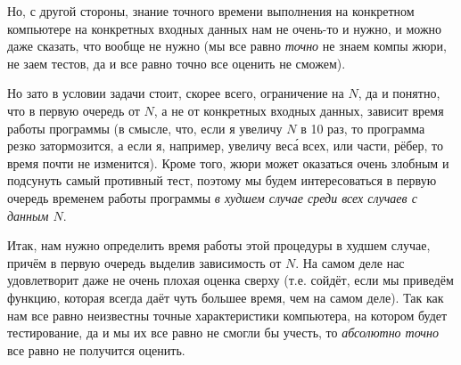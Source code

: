 {Но, с другой стороны, знание точного времени выполнения на конкретном 
компьютере на конкретных входных данных нам не очень-то и нужно, и можно даже 
сказать, что вообще не нужно (мы все равно \textit{точно} не знаем компы жюри, 
не заем тестов, да и все равно точно все оценить не сможем).

Но зато в условии задачи стоит, скорее всего, ограничение на $N$, да и 
понятно, что в первую очередь от $N$, а не от конкретных входных данных,
зависит время работы программы (в смысле, что, если я увеличу $N$ в 10 раз, то 
программа резко затормозится, а если я, например, увеличу вес\'{а} всех, или части, 
рёбер, то время почти не изменится). Кроме того, жюри может оказаться очень 
злобным  
и подсунуть самый противный тест, поэтому мы будем интересоваться в первую 
очередь временем работы программы \textit{в худшем случае среди всех случаев с 
данным $N$}. 


Итак, нам нужно определить время работы этой процедуры в худшем случае, причём 
в первую очередь выделив зависимость от $N$. На самом деле нас удовлетворит 
даже не очень плохая оценка сверху (т.е. сойдёт, если мы приведём функцию, 
которая всегда даёт чуть большее время, чем на самом деле). Так как нам все 
равно неизвестны точные характеристики компьютера, на котором будет 
тестирование, да и мы их все равно не смогли бы учесть, то \textit{абсолютно 
точно} все равно не получится оценить.

}
